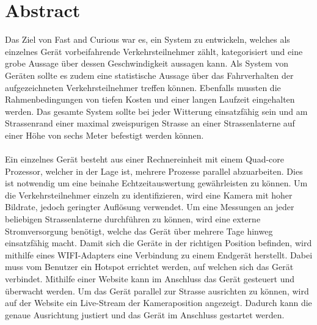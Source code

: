\section{Abstract}
Das Ziel von Fast and Curious war es, ein System zu entwickeln, welches als einzelnes Gerät  vorbeifahrende Verkehrsteilnehmer zählt, kategorisiert und eine grobe Aussage über dessen Geschwindigkeit aussagen kann. Als System von Geräten sollte es zudem eine statistische Aussage über das Fahrverhalten der aufgezeichneten Verkehrsteilnehmer treffen können. Ebenfalls mussten die Rahmenbedingungen von tiefen Kosten und einer langen Laufzeit eingehalten werden. Das gesamte System sollte bei jeder Witterung einsatzfähig sein und am Strassenrand einer maximal zweispurigen Strasse an einer Strassenlaterne auf einer Höhe von sechs Meter befestigt werden können.\\\\
Ein einzelnes Gerät besteht aus einer Rechnereinheit mit einem Quad-core Prozessor, welcher in der Lage ist, mehrere Prozesse parallel abzuarbeiten. Dies ist notwendig um eine beinahe Echtzeitauswertung gewährleisten zu können. Um die Verkehrsteilnehmer einzeln zu identifizieren, wird eine Kamera mit hoher Bildrate, jedoch geringter Auflösung verwendet. Um eine Messungen an jeder beliebigen Strassenlaterne durchführen zu können, wird eine externe Stromversorgung benötigt, welche das Gerät über mehrere Tage hinweg einsatzfähig macht. Damit sich die Geräte in der richtigen Position befinden, wird mithilfe eines WIFI-Adapters eine Verbindung zu einem Endgerät herstellt. Dabei muss vom Benutzer ein Hotspot errichtet werden, auf welchen sich das Gerät verbindet. Mithilfe einer Website kann im Anschluss das Gerät gesteuert und überwacht werden. Um das Gerät parallel zur Strasse ausrichten zu können, wird auf der Website ein Live-Stream der Kameraposition angezeigt. Dadurch kann die genaue Ausrichtung justiert und das Gerät im Anschluss gestartet werden.\\\\
